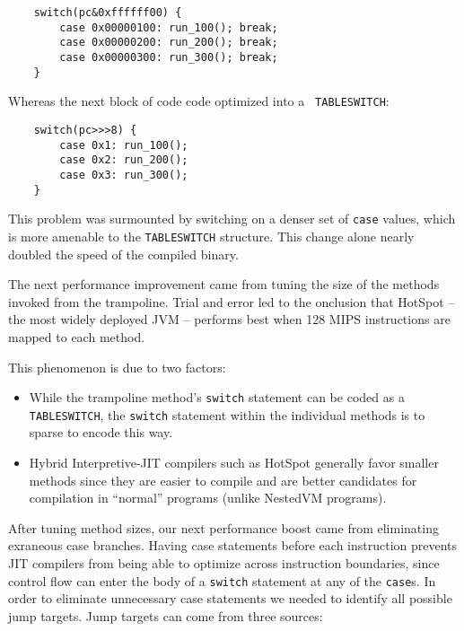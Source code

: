 \documentclass{acmconf}
\begin{document}
{\footnotesize
\begin{verbatim}
    switch(pc&0xffffff00) {
        case 0x00000100: run_100(); break;
        case 0x00000200: run_200(); break;
        case 0x00000300: run_300(); break;
    }
\end{verbatim}}

Whereas the next block of code code optimized into a {\tt
TABLESWITCH}:

{\footnotesize
\begin{verbatim}
    switch(pc>>>8) {
        case 0x1: run_100();
        case 0x2: run_200();
        case 0x3: run_300();
    }
\end{verbatim}}

This problem was surmounted by switching on a denser set of {\tt case}
values, which is more amenable to the {\tt TABLESWITCH} structure.
This change alone nearly doubled the speed of the compiled binary.

The next performance improvement came from tuning the size of the
methods invoked from the trampoline.  Trial and error led to the
onclusion that HotSpot \cite{hotspot} -- the most widely deployed JVM
-- performs best when 128 MIPS instructions are mapped to each method.



This phenomenon is due to two factors:

\begin{itemize}

\item While the trampoline method's {\tt switch} statement can be
      coded as a {\tt TABLESWITCH}, the {\tt switch} statement
      within the individual methods is to sparse to encode this way.

\item Hybrid Interpretive-JIT compilers such as HotSpot generally
      favor smaller methods since they are easier to compile and are
      better candidates for compilation in ``normal'' programs (unlike
      NestedVM programs).

\end{itemize}

After tuning method sizes, our next performance boost came from
eliminating exraneous case branches.  Having case statements before
each instruction prevents JIT compilers from being able to optimize
across instruction boundaries, since control flow can enter the body
of a {\tt switch} statement at any of the {\tt case}s.  In order to
eliminate unnecessary case statements we needed to identify all
possible jump targets.  Jump targets can come from three sources:
\end{document}
